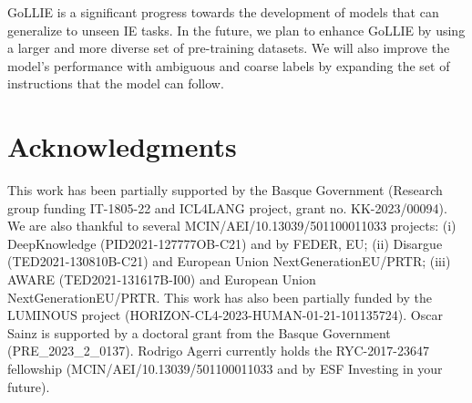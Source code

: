 GoLLIE is a significant progress towards the development of models that can generalize to unseen IE tasks. In the future, we plan to enhance GoLLIE by using a larger and more diverse set of pre-training datasets. We will also improve the model's performance with ambiguous and coarse labels by expanding the set of instructions that the model can follow. 

\section*{Acknowledgments}

This work has been partially supported by %
the Basque Government (Research group funding IT-1805-22 and ICL4LANG project, grant no. KK-2023/00094). We are also thankful to several MCIN/AEI/10.13039/501100011033 projects: (i) DeepKnowledge (PID2021-127777OB-C21) and by FEDER, EU; (ii) Disargue (TED2021-130810B-C21) and European Union NextGenerationEU/PRTR; (iii) AWARE (TED2021-131617B-I00) and European Union NextGenerationEU/PRTR. This work has also been partially funded by the LUMINOUS project (HORIZON-CL4-2023-HUMAN-01-21-101135724). Oscar Sainz is supported by a doctoral grant from the Basque Government (PRE\_2023\_2\_0137). Rodrigo Agerri currently holds the RYC-2017-23647 fellowship (MCIN/AEI/10.13039/501100011033 and by ESF Investing in your future).

\clearpage

